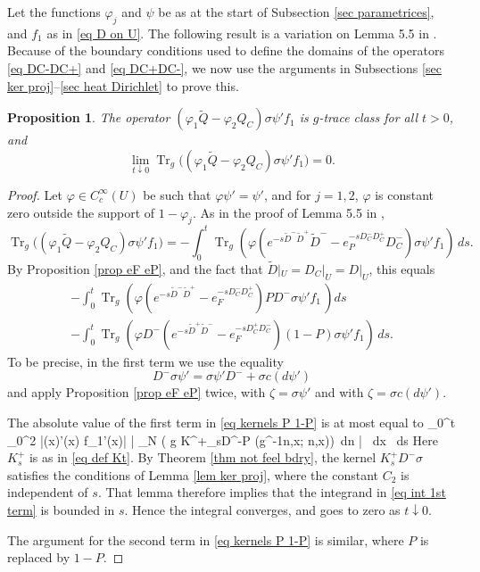 \documentclass[11pt]{article}
\theoremstyle{plain}
\newtheorem{proposition}[theorem]{Proposition}
\theoremstyle{definition}
\theoremstyle{remark}
\numberwithin{equation}{section}
\DeclareMathOperator{\Tr}{Tr}
\DeclareMathOperator{\tr}{tr}
\begin{document}
Let the functions $\varphi_j$ and $\psi$ be as at the start of Subsection \ref{sec parametrices}, and $f_1$ as in \eqref{eq D on U}.
The following result is a variation on Lemma 5.5 in \cite{HWW}. Because of the boundary conditions used to define the domains of the operators \eqref{eq DC-DC+} and \eqref{eq DC+DC-}, we now use the arguments in Subsections \ref{sec ker proj}--\ref{sec heat Dirichlet} to prove this.
\begin{proposition} \label{prop lem 5.5}
The operator $(\varphi_1 \tilde Q - \varphi_2 Q_C) \sigma \psi' f_1$ is $g$-trace class for all $t>0$, and
\[
\lim_{t\downarrow 0} \Tr_g \bigl( (\varphi_1 \tilde Q - \varphi_2 Q_C) \sigma \psi' f_1 \bigr) = 0.
\]
\end{proposition}
\begin{proof}
Let $\varphi \in C^{\infty}_c(U)$ be such that $\varphi \psi' = \psi'$, and
for $j=1,2$, %
 $\varphi$ is constant zero outside the support of $1-\varphi_j$.
As in the proof of Lemma 5.5 in \cite{HWW},
\[
\Tr_g \bigl( (\varphi_1 \tilde Q - \varphi_2 Q_C) \sigma \psi' f_1\bigr)  =
-\int_0^t \Tr_g\left( \varphi \left(e^{-s \tilde D^- \tilde D^+} \tilde D^- - e_P^{-s D_C^- D_C^+} D_C^- \right) \sigma \psi' f_1 \right) \, ds.
\]
By %
Proposition \ref{prop eF eP},
 and the fact that $\tilde D|_U = D_C|_U = D|_U$, this equals
\begin{multline} \label{eq kernels P 1-P}
-\int_0^t \Tr_g\left( \varphi \left(e^{-s \tilde D^- \tilde D^+}- e_F^{-s D_C^- D_C^+} \right) P D^-\sigma \psi' f_1\, \right)ds\\
-\int_0^t  \Tr_g\left(  \varphi D^- \left(e^{-s \tilde D^+ \tilde D^-}- e_F^{-s D_C^+ D_C^-} \right) (1-P)\sigma \psi' f_1 \right) \, ds.
\end{multline}
To be precise, in the first term we use the equality
\[
D^- \sigma \psi' = \sigma \psi' D^- + \sigma c(d\psi')
\]
and apply Proposition \ref{prop eF eP} twice, with $\zeta = \sigma \psi'$ and with $\zeta = \sigma c(d\psi')$.

The absolute value %
 of the first term in \eqref{eq kernels P 1-P} is at most equal to
\int_0^t \int_0^2 |\varphi(x)\psi'(x) f_1'(x)| \left| \int_N \tr\left( g K^+_sD^-\sigma P (g^{-1}n,x; n,x)\right)\, dn \right|
\, dx
\, ds
\eeq
Here $K^+_s$ is as in \eqref{eq def Kt}. By Theorem \ref{thm not feel bdry}, the kernel $K^+_sD^-\sigma$ satisfies the conditions of Lemma \ref{lem ker proj}, where the constant $C_2$ is independent of $s$. That lemma therefore implies that the integrand in \eqref{eq int 1st term} is bounded in $s$. Hence the integral converges, and goes to zero as $t \downarrow 0$.

The argument for the second term in \eqref{eq kernels P 1-P} is similar, where $P$ is replaced by $1-P$.
\end{proof}
\end{document}
